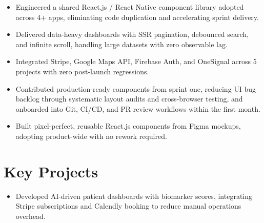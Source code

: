 \documentclass{resume}
\begin{document}
\vspace{3pt}

\begin{itemize}
  \item Engineered a shared React.js / React Native component library adopted across 4+ apps, eliminating code duplication and accelerating sprint delivery.
  \item Delivered data-heavy dashboards with SSR pagination, debounced search, and infinite scroll, handling large datasets with zero observable lag.
  \item Integrated Stripe, Google Maps API, Firebase Auth, and OneSignal across 5 projects with zero post-launch regressions.
\end{itemize}

\vspace{3pt}

\begin{itemize}
  \item Contributed production-ready components from sprint one, reducing UI bug backlog through systematic layout audits and cross-browser testing, and onboarded into Git, CI/CD, and PR review workflows within the first month.
\end{itemize}

\vspace{3pt}


\begin{itemize}
  \item Built pixel-perfect, reusable React.js components from Figma mockups, adopting product-wide with no rework required.
\end{itemize}

\section{Key Projects}

\begin{itemize}
  \item Developed AI-driven patient dashboards with biomarker scores, integrating Stripe subscriptions and Calendly booking to reduce manual operations overhead.
\end{itemize}
\end{document}
